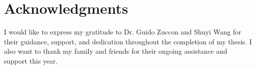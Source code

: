 \chapter{Acknowledgments}
I would like to express my gratitude to Dr. Guido Zuccon and Shuyi Wang for their guidance, support, and dedication throughout the completion of my thesis. I also want to thank my family and friends for their ongoing assistance and support this year.
